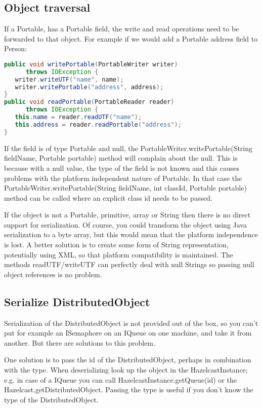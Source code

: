 \subsection*{Object traversal}
If a Portable, has a Portable field, the write and read operations need to be forwarded to that object. For example if we would add a Portable address field to Person:
\begin{lstlisting}[language=java]
public void writePortable(PortableWriter writer) 
      throws IOException {
   writer.writeUTF("name", name);
   writer.writePortable("address", address);
}
public void readPortable(PortableReader reader) 
      throws IOException {
   this.name = reader.readUTF("name");
   this.address = reader.readPortable("address");
}
\end{lstlisting}
If the field is of type Portable and null, the  PortableWriter.writePortable(String fieldName, Portable portable) method will complain about the null. This is because with a null value, the type of the field is not known and this causes problems with the platform independent nature of Portable. In that case the PortableWriter.writePortable(String fieldName, int classId, Portable portable) method can be called where an explicit class id needs to be passed. 

If the object is not a Portable, primitive, array or String then there is no direct support for serialization. Of course, you could transform the object using Java serialization to a byte array, but this would mean that the platform independence is lost. A better solution is to create some form of String representation, potentially using XML, so that platform compatibility is maintained. The methods readUTF/writeUTF can perfectly deal with null Strings so passing null object references is no problem.

\subsection*{Serialize DistributedObject}
Serialization of the DistributedObject is not provided out of the box, so you can't put for example an ISemaphore on an IQueue on one machine, and take it from another. But there are solutions to this problem.

One solution is to pass the id of the DistributedObject, perhaps in combination with the type. When deserializing look up the object in the HazelcastInstance; e.g. in case of a IQueue you can call HazelcastInstance.getQueue(id) or the Hazelcast.getDistributedObject. Passing the type is useful if you don't know the type of the DistributedObject.

